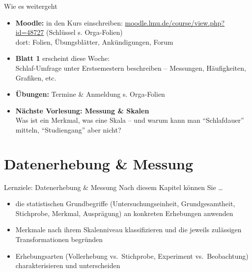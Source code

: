 \documentclass[
  10pt,
  ignorenonframetext,
]{beamer}
\providecommand{\tightlist}{%
  \setlength{\itemsep}{0pt}\setlength{\parskip}{0pt}}
\begin{document}
\begin{frame}{Wie es weitergeht}
\protect\hypertarget{wie-es-weitergeht}{}
\begin{itemize}
\tightlist
\item
  \textbf{Moodle:} in den Kurs einschreiben:
  \href{https://moodle.lmu.de/course/view.php?id=48727}{moodle.lmu.de/course/view.php?id=48727}
  (Schlüssel s. Orga-Folien)\\
  dort: Folien, Übungsblätter, Ankündigungen, Forum
\item
  \textbf{Blatt 1} erscheint diese Woche:\\
  Schlaf-Umfrage unter Erstsemestern beschreiben -- Messungen,
  Häufigkeiten, Grafiken, etc.
\item
  \textbf{Übungen:} Termine \& Anmeldung s. Orga-Folien
\item
  \textbf{Nächste Vorlesung: Messung \& Skalen}\\
  Was ist ein Merkmal, was eine Skala -- und warum kann man
  ``Schlafdauer'' mitteln, ``Studiengang'' aber nicht?
\end{itemize}
\end{frame}

\hypertarget{datenerhebung-messung}{%
\section{Datenerhebung \& Messung}\label{datenerhebung-messung}}

\begin{frame}{Lernziele: Datenerhebung \& Messung}
\protect\hypertarget{lernziele-datenerhebung-messung}{}
Nach diesem Kapitel können Sie \ldots{}

\begin{itemize}
\tightlist
\item
  die statistischen Grundbegriffe (Untersuchungseinheit,
  Grundgesamtheit, Stichprobe, Merkmal, Ausprägung) an konkreten
  Erhebungen anwenden
\item
  Merkmale nach ihrem Skalenniveau klassifizieren und die jeweils
  zulässigen Transformationen begründen
\item
  Erhebungsarten (Vollerhebung vs.~Stichprobe, Experiment
  vs.~Beobachtung) charakterisieren und unterscheiden
\end{itemize}
\end{frame}
\end{document}
